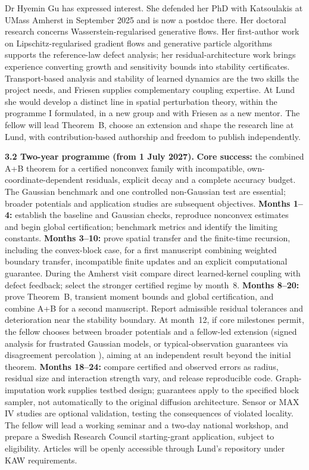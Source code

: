 \documentclass[12pt,a4paper]{article}
\begin{document}
Dr Hyemin Gu has expressed interest. She defended her PhD with Katsoulakis at UMass Amherst in September 2025 and is now a postdoc there. Her doctoral research concerns Wasserstein-regularised generative flows. Her first-author work on Lipschitz-regularised gradient flows and generative particle algorithms \cite{GBPRK24} supports the reference-law defect analysis; her residual-architecture work \cite{GTSK26} brings experience converting growth and sensitivity bounds into stability certificates. Transport-based analysis and stability of learned dynamics are the two skills the project needs, and Friesen supplies complementary coupling expertise. At Lund she would develop a distinct line in spatial perturbation theory, within the programme I formulated, in a new group and with Friesen as a new mentor. The fellow will lead Theorem~B, choose an extension and shape the research line at Lund, with contribution-based authorship and freedom to publish independently.

\textbf{3.2 Two-year programme (from 1 July 2027).}
\textbf{Core success:} the combined A+B theorem for a certified nonconvex family with incompatible, own-coordinate-dependent residuals, explicit decay and a complete accuracy budget. The Gaussian benchmark and one controlled non-Gaussian test are essential; broader potentials and application studies are subsequent objectives.
\textbf{Months 1--4:} establish the baseline and Gaussian checks, reproduce nonconvex estimates and begin global certification; benchmark metrics and identify the limiting constants.
\textbf{Months 3--10:} prove spatial transfer and the finite-time recursion, including the convex-block case, for a first manuscript combining weighted boundary transfer, incompatible finite updates and an explicit computational guarantee. During the Amherst visit compare direct learned-kernel coupling with defect feedback; select the stronger certified regime by month~8.
\textbf{Months 8--20:} prove Theorem~B, transient moment bounds and global certification, and combine A+B for a second manuscript. Report admissible residual tolerances and deterioration near the stability boundary. At month~12, if core milestones permit, the fellow chooses between broader potentials and a fellow-led extension (signed analysis for frustrated Gaussian models, or typical-observation guarantees via disagreement percolation \cite{vdBM94}), aiming at an independent result beyond the initial theorem.
\textbf{Months 18--24:} compare certified and observed errors as radius, residual size and interaction strength vary, and release reproducible code. Graph-imputation work supplies testbed design; guarantees apply to the specified block sampler, not automatically to the original diffusion architecture. Sensor or MAX IV studies are optional validation, testing the consequences of violated locality. The fellow will lead a working seminar and a two-day national workshop, and prepare a Swedish Research Council starting-grant application, subject to eligibility. Articles will be openly accessible through Lund's repository under KAW requirements.
\end{document}
